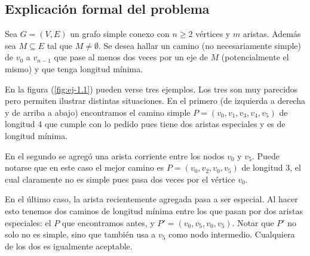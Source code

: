 \subsection{Explicación formal del problema}
Sea $G=(V,E)$ un grafo simple conexo con $n\geq 2$ vértices y $m$ aristas. Además sea $M\subseteq E$ tal que $M\neq \emptyset$. Se desea hallar un camino (no necesariamente simple) de $v_0$ a $v_{n-1}$ que pase al menos dos veces por un eje de $M$ (potencialmente el mismo) y que tenga longitud mínima.

En la figura (\ref{fig:ej-1.1}) pueden verse tres ejemplos. Los tres son muy parecidos pero permiten ilustrar distintas situaciones. En el primero (de izquierda a derecha y de arriba a abajo) encontramos el camino simple $P=(v_0,v_1,v_3,v_4,v_5)$ de longitud 4 que cumple con lo pedido pues tiene dos aristas especiales y es de longitud mínima. 

En el segundo se agregó una arista corriente entre los nodos $v_0$ y $v_5$. Puede notarse que en este caso el mejor camino es $P=(v_0,v_2,v_0,v_5)$ de longitud 3, el cual claramente no es simple pues pasa dos veces por el vértice $v_0$. 

En el último caso, la arista recientemente agregada pasa a ser especial. Al hacer esto tenemos dos caminos de longitud mínima entre los que pasan por dos aristas especiales: el $P$ que encontramos antes, y $P'=(v_0, v_5, v_0, v_5)$. Notar que $P'$ no solo no es simple, sino que también usa a $v_5$ como nodo intermedio. Cualquiera de los dos es igualmente aceptable.

